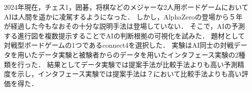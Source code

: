 \abstract
2024年現在，チェス1，囲碁，将棋などのメジャーな2人用ボードゲームにおいてAIは人間を遥かに凌駕するようになった\cite{Nikkei}\cite{deepBlue}\cite{dennou}．
しかし，AlphaZero\cite{AlphaZero}の登場から５年が経過した今もなおその十分な説明手法は登場していない．
そこで，AIの予測する進行図を複数提示することでAIの判断根拠の可視化を試みた．
題材として対戦型ボードゲームの1つであるconnect4\cite{connect4}を選択した．
実験はAI同士の対戦データを用いたデータ実験と被験者からのデータを用いたインタフェース実験の2種類を行った．
結果としてデータ実験では提案手法が比較手法よりも高い予測精度を示し，インタフェース実験では提案手法は？において比較手法よりも高い評価を得た．